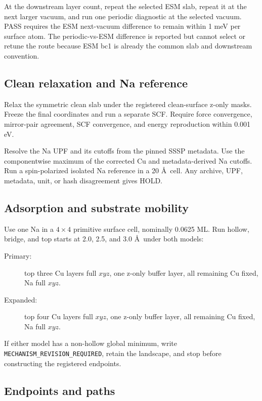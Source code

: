 At the downstream layer count, repeat the selected ESM slab, repeat it at the
next larger vacuum, and run one periodic diagnostic at the selected vacuum.
PASS requires the ESM next-vacuum difference to remain within 1 meV per surface
atom.  The periodic-vs-ESM difference is reported but cannot select or retune
the route because ESM bc1 is already the common slab and downstream convention.

\subsection*{Clean relaxation and Na reference}

Relax the symmetric clean slab under the registered clean-surface z-only masks.
Freeze the final coordinates and run a separate SCF.  Require force convergence,
mirror-pair agreement, SCF convergence, and energy reproduction within 0.001 eV.

Resolve the Na UPF and its cutoffs from the pinned SSSP metadata.  Use the
componentwise maximum of the corrected Cu and metadata-derived Na cutoffs.  Run
a spin-polarized isolated Na reference in a 20 \AA\ cell.  Any archive, UPF,
metadata, unit, or hash disagreement gives HOLD.

\subsection*{Adsorption and substrate mobility}

Use one Na in a $4\times4$ primitive surface cell, nominally 0.0625 ML.  Run
hollow, bridge, and top starts at 2.0, 2.5, and 3.0 \AA\ under both models:

\begin{description}
\item[Primary:] top three Cu layers full $xyz$, one z-only buffer layer, all
remaining Cu fixed, Na full $xyz$.
\item[Expanded:] top four Cu layers full $xyz$, one z-only buffer layer, all
remaining Cu fixed, Na full $xyz$.
\end{description}

If either model has a non-hollow global minimum, write
\texttt{MECHANISM\_REVISION\_REQUIRED}, retain the landscape, and stop before
constructing the registered endpoints.

\subsection*{Endpoints and paths}

